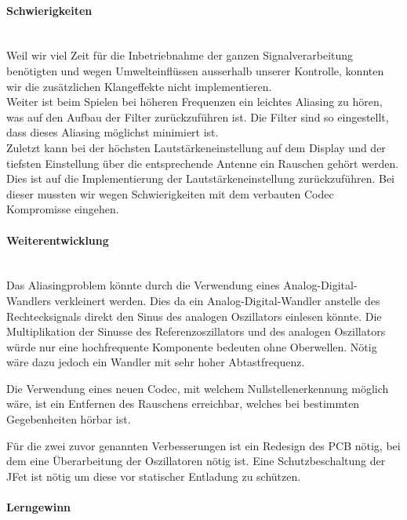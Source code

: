 \paragraph{Schwierigkeiten}\mbox{}\\

Weil wir viel Zeit für die Inbetriebnahme der ganzen Signalverarbeitung benötigten und wegen Umwelteinflüssen ausserhalb unserer Kontrolle, konnten wir die zusätzlichen Klangeffekte nicht implementieren.\\
Weiter ist beim Spielen bei höheren Frequenzen ein leichtes Aliasing zu hören, was auf den Aufbau der Filter zurückzuführen ist. Die Filter sind so eingestellt, dass dieses Aliasing möglichst minimiert ist.\\
Zuletzt kann bei der höchsten Lautstärkeneinstellung auf dem Display und der tiefsten Einstellung über die entsprechende Antenne ein Rauschen gehört werden. Dies ist auf die Implementierung der Lautstärkeneinstellung zurückzuführen. Bei dieser mussten wir wegen Schwierigkeiten mit dem verbauten Codec Kompromisse eingehen.

\paragraph{Weiterentwicklung}\mbox{}\\

Das Aliasingproblem könnte durch die Verwendung eines Analog-Digital-Wandlers verkleinert werden. Dies da ein Analog-Digital-Wandler anstelle des Rechtecksignals direkt den Sinus des analogen Oszillators einlesen könnte. Die Multiplikation der Sinusse des Referenzoszillators und des analogen Oszillators würde nur eine hochfrequente Komponente bedeuten ohne Oberwellen. Nötig wäre dazu jedoch ein Wandler mit sehr hoher Abtastfrequenz.

Die Verwendung eines neuen Codec, mit welchem Nullstellenerkennung möglich wäre, ist ein Entfernen des Rauschens erreichbar, welches bei bestimmten Gegebenheiten hörbar ist.

Für die zwei zuvor genannten Verbesserungen ist ein Redesign des PCB nötig, bei dem eine Überarbeitung der Oszillatoren nötig ist. Eine Schutzbeschaltung der JFet ist nötig um diese vor statischer Entladung zu schützen.

\paragraph{Lerngewinn} \mbox{}\\

